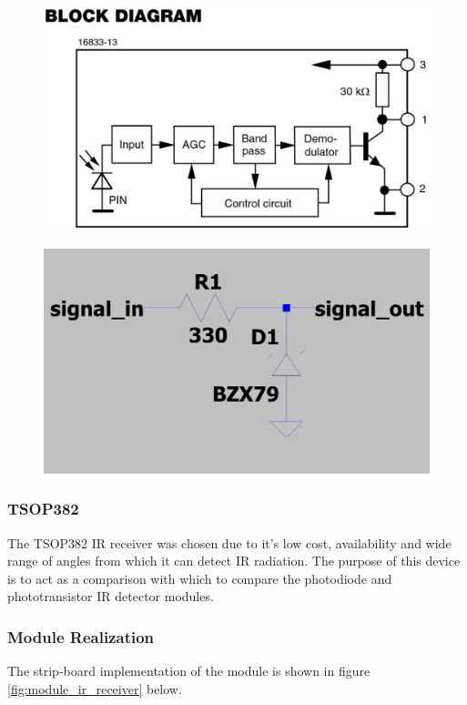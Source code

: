 \begin{figure}[H]
	\centering
	\begin{minipage}{.5\textwidth}
		\centering
		\includegraphics[width=.8\linewidth]{figures/design/TSOP382_block_diagram}
		\label{fig:tsop382_block_diagram}
	\end{minipage}%
	\begin{minipage}{.5\textwidth}
		\centering
		\includegraphics[width=.8\linewidth]{figures/design/over_voltage_protection}
		\label{fig:schematic_voltage_clamp}
	\end{minipage}
\end{figure}

\subsubsection{TSOP382}

The TSOP382 IR receiver was chosen due to it's low cost, availability and wide range of angles from which it can detect IR radiation. The purpose of this device is to act as a comparison with which to compare the photodiode and phototransistor IR detector modules.


\subsubsection{Module Realization}
The strip-board implementation of the module is shown in figure \ref{fig:module_ir_receiver} below.

